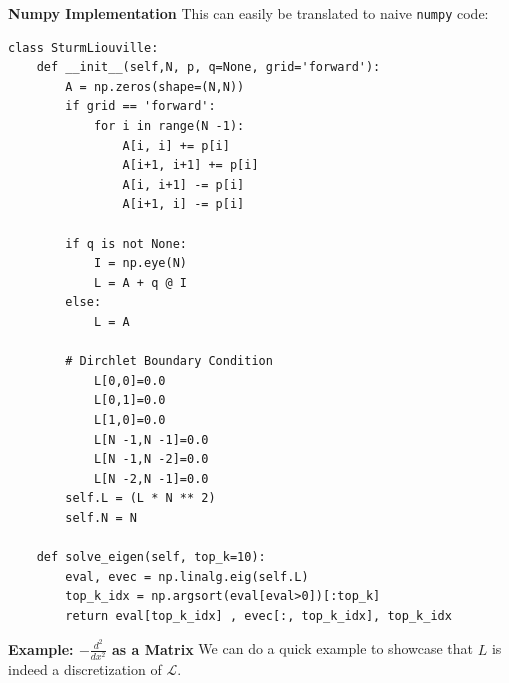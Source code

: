 \textbf{Numpy Implementation}
This can easily be translated to naive \texttt{numpy} code:

\begin{verbatim}
class SturmLiouville:
    def __init__(self,N, p, q=None, grid='forward'):
        A = np.zeros(shape=(N,N))
        if grid == 'forward':
            for i in range(N -1):
                A[i, i] += p[i]
                A[i+1, i+1] += p[i]
                A[i, i+1] -= p[i]
                A[i+1, i] -= p[i]

        if q is not None:
            I = np.eye(N) 
            L = A + q @ I
        else:
            L = A
        
        # Dirchlet Boundary Condition
            L[0,0]=0.0
            L[0,1]=0.0
            L[1,0]=0.0
            L[N -1,N -1]=0.0
            L[N -1,N -2]=0.0
            L[N -2,N -1]=0.0
        self.L = (L * N ** 2)
        self.N = N

    def solve_eigen(self, top_k=10):
        eval, evec = np.linalg.eig(self.L)
        top_k_idx = np.argsort(eval[eval>0])[:top_k]
        return eval[top_k_idx] , evec[:, top_k_idx], top_k_idx
\end{verbatim}

\textbf{Example: $-\frac{d^2}{dx^2}$ as a Matrix}
We can do a quick example to showcase that $L$ is indeed a discretization of $\mathcal L$.

